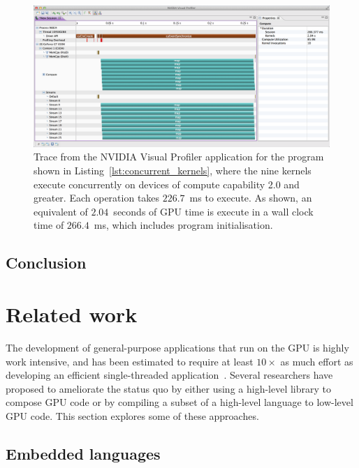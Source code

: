 \begin{figure}[tbp]
    \centering
    \includegraphics[width=\textwidth]{images/sec-4/concurrent_kernels}
    \caption[Profiling trace of a program which executes kernels
    concurrently]{Trace from the NVIDIA Visual Profiler application for the
    program shown in Listing~\ref{lst:concurrent_kernels}, where the nine
     kernels execute concurrently on devices of compute capability 2.0
    and greater. Each  operation takes $226.7$~ms to execute. As
    shown, an equivalent of $2.04$~seconds of GPU time is execute in a wall
    clock time of $266.4$~ms, which includes program initialisation.}
    \label{fig:concurrent_kernels}
\end{figure}


\subsection{Conclusion}

\section{Related work}
\label{sec:implementation_related}

The development of general-purpose applications that run on the GPU is highly
work intensive, and has been estimated to require at least $10\times$ as much
effort as developing an efficient single-threaded
application~\cite{Sweeney:2009ua}. Several researchers have proposed to
ameliorate the status quo by either using a high-level library to compose GPU
code or by compiling a subset of a high-level language to low-level GPU code.
This section explores some of these approaches.


\subsection{Embedded languages}

